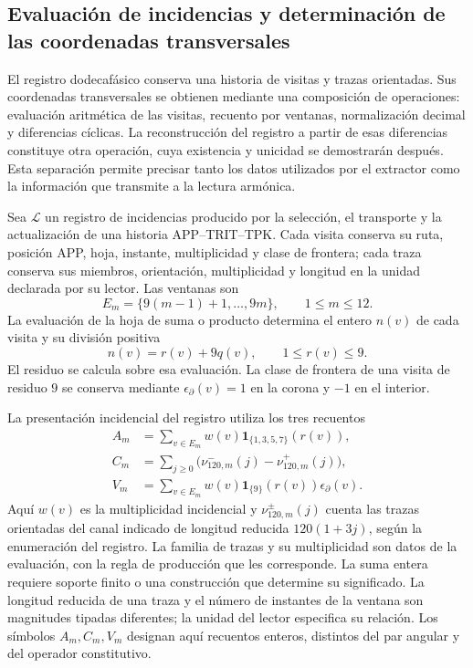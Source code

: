 \subsection{Evaluación de incidencias y determinación de las coordenadas transversales}
\label{iii:r25:incidencias}

El registro dodecafásico conserva una historia de visitas y trazas
orientadas. Sus coordenadas transversales se obtienen mediante una
composición de operaciones: evaluación aritmética de las visitas,
recuento por ventanas, normalización decimal y diferencias cíclicas.
La reconstrucción del registro a partir de esas diferencias constituye
otra operación, cuya existencia y unicidad se demostrarán después.
Esta separación permite precisar tanto los datos utilizados por el
extractor como la información que transmite a la lectura armónica.

Sea $\mathscr L$ un registro de incidencias producido por la selección,
el transporte y la actualización de una historia APP--TRIT--TPK.
Cada visita conserva su ruta, posición APP, hoja, instante,
multiplicidad y clase de frontera; cada traza conserva sus miembros,
orientación, multiplicidad y longitud en la unidad declarada por su
lector. Las ventanas son
\[
 E_m=\{9(m-1)+1,\ldots,9m\},\qquad 1\leq m\leq12.
\]
La evaluación de la hoja de suma o producto determina el entero
$n(v)$ de cada visita y su división positiva
\[
 n(v)=r(v)+9q(v),\qquad 1\leq r(v)\leq9.
\]
El residuo se calcula sobre esa evaluación. La clase de frontera de
una visita de residuo $9$ se conserva mediante
$\epsilon_\partial(v)=1$ en la corona y $-1$ en el interior.

La presentación incidencial del registro utiliza los tres recuentos
\begin{align}
 A_m&=\sum_{v\in E_m}w(v)
       \mathbf1_{\{1,3,5,7\}}(r(v)),\label{iii:r25:recuento-a}\\
 C_m&=\sum_{j\geq0}
       \bigl(\nu^-_{120,m}(j)-\nu^+_{120,m}(j)\bigr),
       \label{iii:r25:recuento-c}\\
 V_m&=\sum_{v\in E_m}w(v)
       \mathbf1_{\{9\}}(r(v))\epsilon_\partial(v).
       \label{iii:r25:recuento-v}
\end{align}
Aquí $w(v)$ es la multiplicidad incidencial y
$\nu^\pm_{120,m}(j)$ cuenta las trazas orientadas del canal indicado
de longitud reducida $120(1+3j)$, según la enumeración del registro.
La familia de trazas y su multiplicidad son datos de la evaluación,
con la regla de producción que les corresponde. La suma entera requiere
soporte finito o una construcción que determine su significado.
La longitud reducida de una traza y el número de instantes de la
ventana son magnitudes tipadas diferentes; la unidad del lector
especifica su relación. Los símbolos $A_m,C_m,V_m$ designan aquí
recuentos enteros, distintos del par angular y del operador constitutivo.

